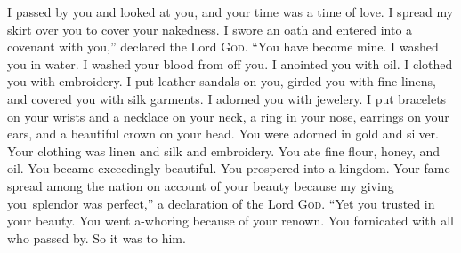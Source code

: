
\begin{inparaenum}
   I passed by you and looked at you, and your time was a time of love. I spread my skirt over you to cover your nakedness. I swore an oath and entered into a covenant with you,'' declared the Lord \textsc{God}. ``You have become mine.%
   I washed you in water. I washed your blood from off you. I anointed you with oil.%
   I clothed you with embroidery. I put leather sandals on you, girded you with fine linens, and covered you with silk garments.%
   I adorned you with jewelery. I put bracelets on your wrists and a necklace on your neck,%
   a ring in your nose, earrings on your ears, and a beautiful crown on your head.%
   You were adorned in gold and silver. Your clothing was linen and silk and embroidery. You ate fine flour, honey, and oil. You became exceedingly beautiful. You prospered into a kingdom.%
   Your fame spread among the nation on account of your beauty because my giving you\understood\ splendor was perfect,'' a declaration of the Lord \textsc{God}.%
   ``Yet you trusted in your beauty. You went a-whoring because of your renown. You fornicated with all who passed by. So it was to him.%
  
  
  
\end{inparaenum}
